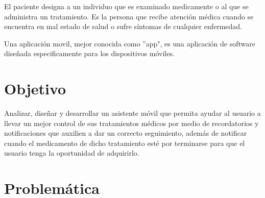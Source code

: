El paciente designa a un individuo que es examinado medicamente o al que se administra un tratamiento\cite{Referencia9}. Es la persona que recibe atención médica cuando se encuentra en mal estado de salud o sufre síntomas de cualquier enfermedad.

Una aplicación movil, mejor conocida como ''app", es una aplicación de software diseñada especificamente para los dispositivos móviles\cite{Referencia7}.





%
%
%

\section{Objetivo}
Analizar, diseñar y desarrollar un asistente móvil que permita ayudar al usuario a llevar un mejor control de sus tratamientos médicos por medio de recordatorios y notificaciones que auxilien a dar un correcto seguimiento, además de notificar cuando el medicamento de dicho tratamiento esté por terminarse para que el usuario tenga la oportunidad de adquirirlo.

\section{Problemática}

